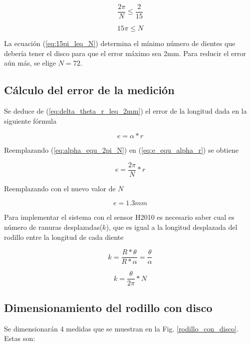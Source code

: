 \documentclass[main_conf.tex]{subfiles}
\begin{document}
\begin{equation}
\frac{2\pi}{N}\leq \frac{2}{15}
\end{equation}

\begin{equation}
\label{eq:15pi_leq_N}
15\pi \leq N
\end{equation}

La ecuación (\ref{eq:15pi_leq_N}) determina el mínimo número de
dientes que debería tener el disco para que el error máximo sea
2mm. Para reducir el error aún más, se elige $N=72$.

\subsection{Cálculo del error de la medición}

Se deduce de (\ref{eq:delta_theta_r_leq_2mm}) el error de la
longitud dada en la siguiente fórmula

\begin{equation}
\label{eq:e_equ_alpha_r}
e = \alpha * r
\end{equation}

Reemplazando (\ref{eq:alpha_equ_2pi_N}) en (\ref{eq:e_equ_alpha_r}) se
obtiene

\begin{equation}
e = \frac{2\pi}{N} * r
\end{equation}

Reemplazando con el nuevo valor de $N$

\begin{equation}
e = 1.3mm
\end{equation}

Para implementar el sistema con el sensor H2010 es necesario saber
cual es número de ranuras desplazadas($k$), que es igual a
la longitud desplazada del rodillo entre la longitud de cada diente

\begin{equation}
k = \frac{R * \theta}{R * \alpha}
  = \frac{\theta}{\alpha}
\end{equation}

\begin{equation}
k = \frac{\theta}{2\pi}*N
\end{equation}

\subsection{Dimensionamiento del rodillo con disco}
Se dimensionarán 4 medidas que se muestran en la Fig.
\ref{rodillo_con_disco}. Estas son:
\end{document}
